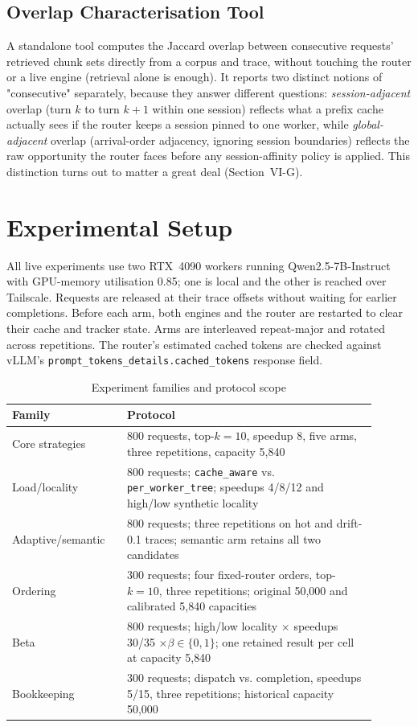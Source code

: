 \documentclass[conference]{IEEEtran}
\begin{document}
\subsection{Overlap Characterisation Tool}

A standalone tool computes the Jaccard overlap between consecutive
requests' retrieved chunk sets directly from a corpus and trace,
without touching the router or a live engine (retrieval alone is
enough). It reports two distinct notions of "consecutive" separately,
because they answer different questions: \emph{session-adjacent}
overlap (turn $k$ to turn $k{+}1$ within one session) reflects what a
prefix cache actually sees if the router keeps a session pinned to one
worker, while \emph{global-adjacent} overlap (arrival-order adjacency,
ignoring session boundaries) reflects the raw opportunity the router
faces before any session-affinity policy is applied. This distinction
turns out to matter a great deal (Section~VI-G).

\section{Experimental Setup}

All live experiments use two RTX~4090 workers running
Qwen2.5-7B-Instruct with GPU-memory utilisation 0.85; one is local and
the other is reached over Tailscale. Requests are released at their
trace offsets without waiting for earlier completions. Before each arm,
both engines and the router are restarted to clear their cache and
tracker state. Arms are interleaved repeat-major and rotated across
repetitions. The router's estimated cached tokens are checked against
vLLM's \texttt{prompt\_tokens\_details.cached\_tokens} response field.

\begin{table}[t]
\caption{Experiment families and protocol scope}
\label{tab:protocol}
\centering
\footnotesize
\setlength{\tabcolsep}{3pt}
\begin{tabular}{@{}p{0.28\linewidth}p{0.62\linewidth}@{}}
\toprule
\textbf{Family} & \textbf{Protocol} \\
\midrule
Core strategies & 800 requests, top-$k{=}10$, speedup 8, five arms,
three repetitions, capacity 5{,}840 \\
Load/locality & 800 requests; \texttt{cache\_aware} vs.
\texttt{per\_worker\_tree}; speedups 4/8/12 and high/low synthetic
locality \\
Adaptive/semantic & 800 requests; three repetitions on hot and drift-0.1
traces; semantic arm retains all two candidates \\
Ordering & 300 requests; four fixed-router orders, top-$k{=}10$, three
repetitions; original 50{,}000 and calibrated 5{,}840 capacities \\
Beta & 800 requests; high/low locality $\times$ speedups 30/35
$\times\beta\in\{0,1\}$; one retained result per cell at capacity 5{,}840 \\
Bookkeeping & 300 requests; dispatch vs. completion, speedups 5/15, three
repetitions; historical capacity 50{,}000 \\
\bottomrule
\end{tabular}
\end{table}
\end{document}
